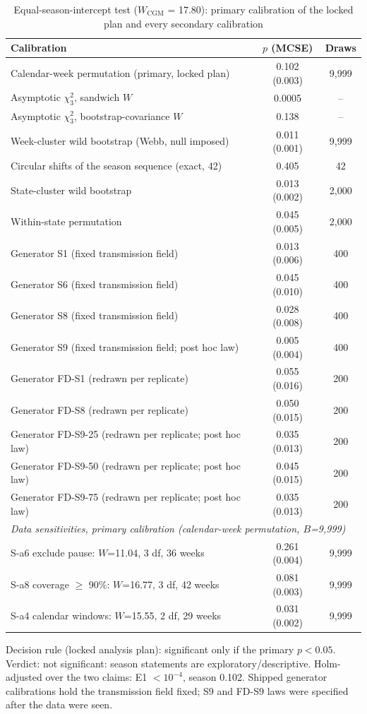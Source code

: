 \begin{table}[!tbp]
\centering
\scriptsize
\setlength{\tabcolsep}{3pt}
\caption{Equal-season-intercept test ($W_{\mathrm{CGM}}$ = 17.80): primary calibration of the locked plan and every secondary calibration}
\label{tab:rev_season_calibration}
\begin{tabularx}{\linewidth}{@{}X c c@{}}
\toprule
Calibration & $p$ (MCSE) & Draws \\
\midrule
Calendar-week permutation (primary, locked plan) & 0.102 (0.003) & 9,999 \\
Asymptotic $\chi^2_3$, sandwich $W$ & 0.0005 & -- \\
Asymptotic $\chi^2_3$, bootstrap-covariance $W$ & 0.138 & -- \\
Week-cluster wild bootstrap (Webb, null imposed) & 0.011 (0.001) & 9,999 \\
Circular shifts of the season sequence (exact, 42) & 0.405 & 42 \\
State-cluster wild bootstrap & 0.013 (0.002) & 2,000 \\
Within-state permutation & 0.045 (0.005) & 2,000 \\
Generator S1 (fixed transmission field) & 0.013 (0.006) & 400 \\
Generator S6 (fixed transmission field) & 0.045 (0.010) & 400 \\
Generator S8 (fixed transmission field) & 0.028 (0.008) & 400 \\
Generator S9 (fixed transmission field; post hoc law) & 0.005 (0.004) & 400 \\
Generator FD-S1 (redrawn per replicate) & 0.055 (0.016) & 200 \\
Generator FD-S8 (redrawn per replicate) & 0.050 (0.015) & 200 \\
Generator FD-S9-25 (redrawn per replicate; post hoc law) & 0.035 (0.013) & 200 \\
Generator FD-S9-50 (redrawn per replicate; post hoc law) & 0.045 (0.015) & 200 \\
Generator FD-S9-75 (redrawn per replicate; post hoc law) & 0.035 (0.013) & 200 \\
\midrule
\multicolumn{3}{l}{\emph{Data sensitivities, primary calibration (calendar-week permutation, $B$=9,999)}} \\
S-a6 exclude pause: $W$=11.04, 3 df, 36 weeks & 0.261 (0.004) & 9,999 \\
S-a8 coverage $\ge$ 90\%: $W$=16.77, 3 df, 42 weeks & 0.081 (0.003) & 9,999 \\
S-a4 calendar windows: $W$=15.55, 2 df, 29 weeks & 0.031 (0.002) & 9,999 \\
\bottomrule
\end{tabularx}
\par\smallskip\parbox{\linewidth}{\scriptsize\linespread{1.15}\selectfont Decision rule (locked analysis plan): significant only if the primary $p<0.05$. Verdict: not significant: season statements are exploratory/descriptive. Holm-adjusted over the two claims: E1 $<10^{-4}$, season 0.102. Shipped generator calibrations hold the transmission field fixed; S9 and FD-S9 laws were specified after the data were seen.}
\end{table}
